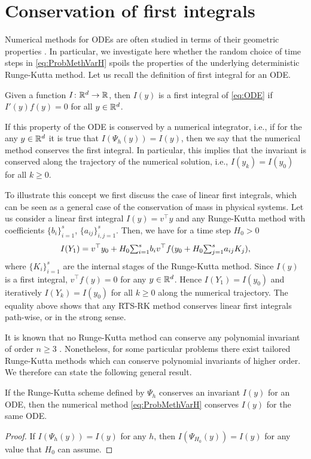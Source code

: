 \documentclass[10pt]{article}
\begin{document}
\section{Conservation of first integrals}\label{sec:GeomProperties}
Numerical methods for ODEs are often studied in terms of their geometric properties \cite{HLW06}. In particular, we investigate here whether the random choice of time steps in \eqref{eq:ProbMethVarH} spoils the properties of the underlying deterministic Runge-Kutta method. Let us recall the definition of first integral for an ODE.
\begin{definition} Given a function $I\colon\mathbb{R}^d\to\mathbb{R}$, then $I(y)$ is a first integral of \eqref{eq:ODE} if $I'(y)f(y) = 0$ for all $y \in \mathbb{R}^d$. 
\end{definition}	
If this property of the ODE is conserved by a numerical integrator, i.e., if for the any $y\in\mathbb{R}^d$ it is true that $I(\Psi_h(y)) = I(y)$, then we say that the numerical method conserves the first integral. In particular, this implies that the invariant is conserved along the trajectory of the numerical solution, i.e., $I(y_k) = I(y_0)$ for all $k\geq 0$.
	
\begin{example} To illustrate this concept we first discuss the case of linear first integrals, which can be seen as a general case of the conservation of mass in physical systems. Let us consider a linear first integral $I(y) = v^\top y$ and any Runge-Kutta method with coefficients $\{b_i\}_{i=1}^s$, $\{a_{ij}\}_{i,j=1}^s$. Then, we have for a time step $H_0 > 0$
	\begin{equation}
		I(Y_1) = v^\top y_0 + H_0 {\textstyle\sum}_{i=1}^s b_iv^\top f(y_0 + H_0{\textstyle\sum}_{j=1}^{s} a_{ij}K_j),
	\end{equation}
	where $\{K_i\}_{i=1}^s$ are the internal stages of the Runge-Kutta method. Since $I(y)$ is a first integral, $v^\top f(y) = 0$ for any $y \in \mathbb{R}^d$. Hence $I(Y_1)  = I(y_0)$ and iteratively $I(Y_k) = I(y_0)$ for all $k \geq 0$ along the numerical trajectory. The equality above shows that any RTS-RK method conserves linear first integrals path-wise, or in the strong sense. 
\end{example}

It is known that no Runge-Kutta method can conserve any polynomial invariant of order $n \geq 3$ \cite{HLW06}. Nonetheless, for some particular problems there exist tailored Runge-Kutta methods which can conserve polynomial invariants of higher order. We therefore can state the following general result.
\begin{theorem}\label{thm:PolyInvariants} If the Runge-Kutta scheme defined by $\Psi_h$ conserves an invariant $I(y)$ for an ODE, then the numerical method \eqref{eq:ProbMethVarH} conserves $I(y)$ for the same ODE.
\end{theorem}
\begin{proof} If $I(\Psi_h(y)) = I(y)$ for any $h$, then $I(\Psi_{H_0}(y)) = I(y)$ for any value that $H_0$ can assume.
\end{proof}
\end{document}
